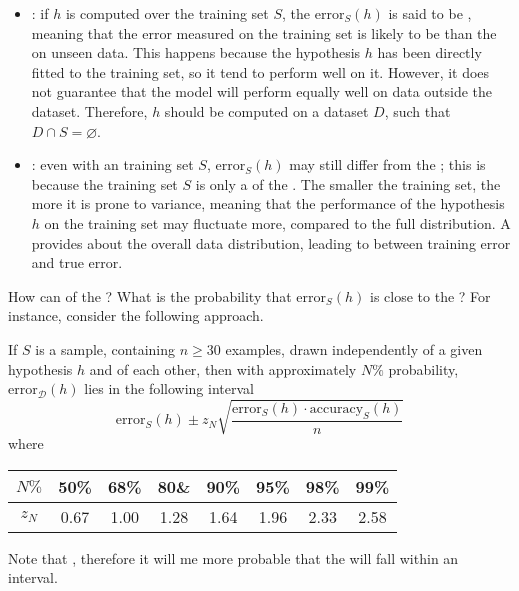 \documentclass[a4paper, 12pt]{report}
\begin{document}
    \begin{itemize}
        \item {}: if $h$ is computed over the training set $S$, the $\mathrm{error}_S(h)$ is said to be , meaning that the error measured on the training set is likely to be  than the  on unseen data. This happens because the hypothesis $h$ has been directly fitted to the training set, so it tend to perform well on it. However, it does not guarantee that the model will perform equally well on data outside the dataset. Therefore, $h$ should be computed on a dataset $D$, such that $D \cap S = \varnothing$.
        \item {}: even with an  training set $S$, $\mathrm{error}_S(h)$ may still differ from the ; this is because the training set $S$ is only a  of the . The smaller the training set, the more it is prone to variance, meaning that the performance of the hypothesis $h$ on the training set may fluctuate more, compared to the full distribution. A  provides  about the overall data distribution, leading to  between training error and true error.
    \end{itemize}

    How can  of the ? What is the probability that $\mathrm{error}_S(h)$ is close to the ? For instance, consider the following approach.

    \begin{example}
        If $S$ is a sample, containing $n \ge 30$ examples, drawn independently of a given hypothesis $h$ and of each other, then with approximately $N\%$ probability, $\mathrm{error}_\mathcal D(h)$ lies in the following interval $$\mathrm{error}_S(h) \pm z_N \sqrt{\dfrac{\mathrm{error}_S(h) \cdot \mathrm{accuracy}_S(h)}{n}}$$ where
        \begin{table}[H]
            \centering
            \begin{tabular}{c|ccccccc}
                $N\%$ & 50\% & 68\% & 80\& & 90\% & 95\% & 98\% & 99\% \\
                \hline
                $z_N$ & 0.67 & 1.00 & 1.28 & 1.64 & 1.96 & 2.33 & 2.58
            \end{tabular}
        \end{table}

        Note that , therefore it will me more probable that the  will fall within an interval.
    \end{example}
\end{document}
